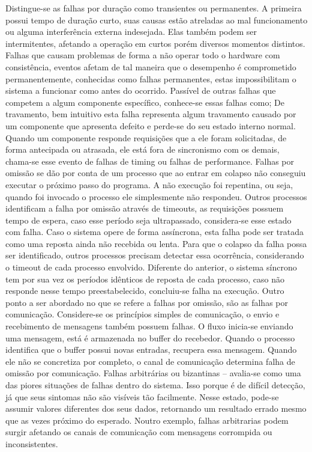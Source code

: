 Distingue-se as falhas por duração como transientes ou permanentes. A primeira possui tempo de duração curto, suas causas estão atreladas ao mal funcionamento ou alguma interferência externa indesejada. Elas também podem ser intermitentes, afetando a operação em curtos porém diversos momentos distintos.
Falhas que causam problemas de forma a não operar todo o hardware com consistência,
 eventos afetam de tal maneira que o desempenho é comprometido permanentemente, conhecidas como falhas permanentes, estas impossibilitam o sistema a funcionar como antes do ocorrido.
Passível de outras falhas que competem a algum componente específico, conhece-se essas falhas como;
De travamento, bem intuitivo esta falha representa algum travamento causado por um componente que apresenta defeito e perde-se do seu estado interno normal.
Quando um componente responde requisições que a ele foram solicitadas, de forma antecipada ou atrasada, ele está fora de sincronismo com os demais, chama-se esse evento de falhas de timing ou falhas de performance.
Falhas por omissão se dão por conta de um processo que ao entrar em colapso não conseguiu executar o próximo passo do programa. A não execução foi repentina, ou seja, quando foi invocado o processo ele simplesmente não respondeu. Outros processos identificam a falha por omissão através de timeouts, as requisições possuem tempo de espera, caso esse período seja ultrapassado, considera-se esse estado com falha.
Caso o sistema opere de forma assíncrona, esta falha pode ser tratada como uma reposta ainda não recebida ou lenta. Para que o colapso da falha possa ser identificado, outros processos precisam detectar essa ocorrência, considerando o timeout de cada processo envolvido. Diferente do anterior, o sistema síncrono tem por sua vez os períodos idênticos de reposta de cada processo, caso não responde nesse tempo preestabelecido, concluiu-se falha na execução.
Outro ponto a ser abordado no que se refere a falhas por omissão, são as falhas por comunicação. Considere-se os princípios simples de comunicação, o envio e recebimento de mensagens também possuem falhas. O fluxo inicia-se enviando uma mensagem, está é armazenada no buffer do recebedor. Quando o processo identifica que o buffer possui novas entradas, recupera essa mensagem. Quando ele não se concretiza por completo, o canal de comunicação determina falha de omissão por comunicação.
Falhas arbitrárias ou bizantinas – avalia-se como uma das piores situações de falhas dentro do sistema. Isso porque é de difícil detecção, já que seus sintomas não são visíveis tão facilmente. Nesse estado, pode-se assumir valores diferentes dos seus dados, retornando um resultado errado mesmo que as vezes próximo do esperado. Noutro exemplo, falhas arbitrarias podem surgir afetando os canais de comunicação com mensagens corrompida ou inconsistentes.
